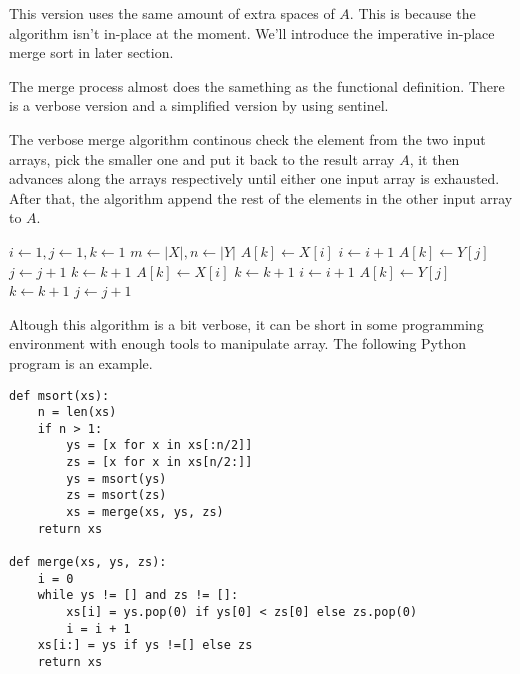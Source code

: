 \documentclass{article}
\begin{document}
This version uses the same amount of extra spaces of $A$. This is because the  algorithm
isn't in-place at the moment. We'll introduce the imperative in-place merge sort in later section.

The merge process almost does the samething as the functional definition. There is a verbose version
and a simplified version by using sentinel.

The verbose merge algorithm continous check the element from the two input arrays, pick the smaller one
and put it back to the result array $A$, it then advances along the arrays respectively until either
one input array is exhausted. After that, the algorithm append the rest of the elements in the other
input array to $A$.

\begin{algorithmic}
  \State $i \gets 1, j\gets 1, k\gets 1$
  \State $m \gets |X|, n \gets |Y|$
      \State $A[k] \gets X[i]$
      \State $i \gets i + 1$
    \Else
      \State $A[k] \gets Y[j]$
      \State $j \gets j + 1$
    \EndIf
    \State $k \gets k + 1$
  \EndWhile
    \State $A[k] \gets X[i]$
    \State $k \gets k + 1$
    \State $i \gets i + 1$
  \EndWhile
    \State $A[k] \gets Y[j]$
    \State $k \gets k + 1$
    \State $j \gets j + 1$
  \EndWhile
\EndProcedure
\end{algorithmic}

Altough this algorithm is a bit verbose, it can be short in some programming environment with enough tools
to manipulate array. The following Python program is an example.

\lstset{language=Python}
\begin{lstlisting}
def msort(xs):
    n = len(xs)
    if n > 1:
        ys = [x for x in xs[:n/2]]
        zs = [x for x in xs[n/2:]]
        ys = msort(ys)
        zs = msort(zs)
        xs = merge(xs, ys, zs)
    return xs

def merge(xs, ys, zs):
    i = 0
    while ys != [] and zs != []:
        xs[i] = ys.pop(0) if ys[0] < zs[0] else zs.pop(0)
        i = i + 1
    xs[i:] = ys if ys !=[] else zs
    return xs
\end{lstlisting}
\end{document}

